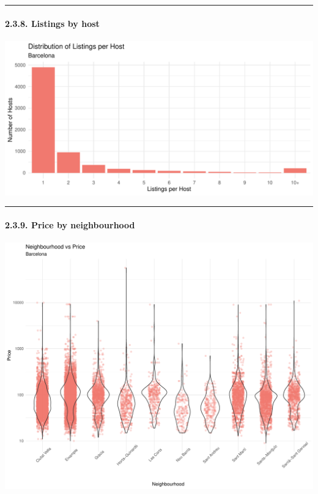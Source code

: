 \documentclass[
]{article}
\begin{document}
\begin{center}\rule{0.5\linewidth}{0.5pt}\end{center}

\hypertarget{listings-by-host}{%
\paragraph{2.3.8. Listings by host}\label{listings-by-host}}

\begin{center}\includegraphics{Barcelona-AirBnB-Insights_files/figure-latex/plot8-1} \end{center}

\begin{center}\rule{0.5\linewidth}{0.5pt}\end{center}

\hypertarget{price-by-neighbourhood}{%
\paragraph{2.3.9. Price by neighbourhood}\label{price-by-neighbourhood}}

\begin{center}\includegraphics{Barcelona-AirBnB-Insights_files/figure-latex/plot9-1} \end{center}
\end{document}
